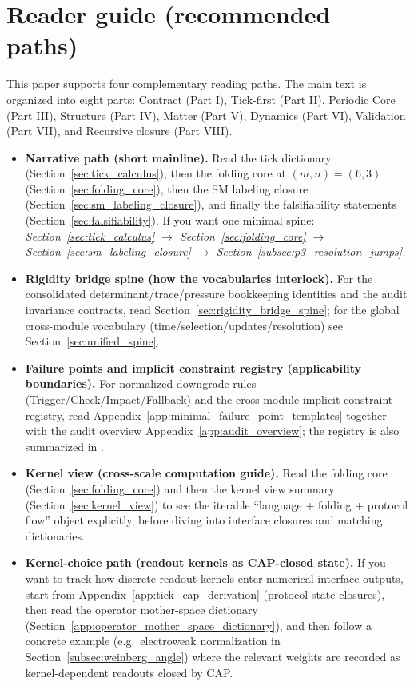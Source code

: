 \section*{Reader guide (recommended paths)}
This paper supports four complementary reading paths. The main text is organized into eight parts: Contract (Part I), Tick-first (Part II), Periodic Core (Part III), Structure (Part IV), Matter (Part V), Dynamics (Part VI), Validation (Part VII), and Recursive closure (Part VIII).
\begin{itemize}
\item \textbf{Narrative path (short mainline).}
Read the tick dictionary (Section~\ref{sec:tick_calculus}), then the folding core at $(m,n)=(6,3)$ (Section~\ref{sec:folding_core}), then the SM labeling closure (Section~\ref{sec:sm_labeling_closure}), and finally the falsifiability statements (Section~\ref{sec:falsifiability}).
If you want one minimal spine: \textit{Section~\ref{sec:tick_calculus} $\to$ Section~\ref{sec:folding_core} $\to$ Section~\ref{sec:sm_labeling_closure} $\to$ Section~\ref{subsec:p3_resolution_jumps}.}
\item \textbf{Rigidity bridge spine (how the vocabularies interlock).}
For the consolidated determinant/trace/pressure bookkeeping identities and the audit invariance contracts, read Section~\ref{sec:rigidity_bridge_spine}; for the global cross-module vocabulary (time/selection/updates/resolution) see Section~\ref{sec:unified_spine}.
\item \textbf{Failure points and implicit constraint registry (applicability boundaries).}
For normalized downgrade rules (Trigger/Check/Impact/Fallback) and the cross-module implicit-constraint registry, read Appendix~\ref{app:minimal_failure_point_templates} together with the audit overview Appendix~\ref{app:audit_overview}; the registry is also summarized in .
\item \textbf{Kernel view (cross-scale computation guide).}
Read the folding core (Section~\ref{sec:folding_core}) and then the kernel view summary (Section~\ref{sec:kernel_view}) to see the iterable ``language + folding + protocol flow'' object explicitly, before diving into interface closures and matching dictionaries.
\item \textbf{Kernel-choice path (readout kernels as CAP-closed state).}
If you want to track how discrete readout kernels enter numerical interface outputs, start from Appendix~\ref{app:tick_cap_derivation} (protocol-state closures), then read the operator mother-space dictionary (Section~\ref{app:operator_mother_space_dictionary}), and then follow a concrete example (e.g.\ electroweak normalization in Section~\ref{subsec:weinberg_angle}) where the relevant weights are recorded as kernel-dependent readouts closed by CAP.

\end{itemize}
